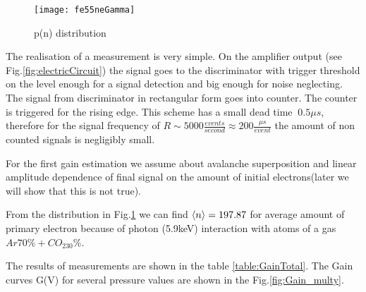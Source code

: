 	\begin{figure}[!h]
	\centering
	\texttt{[image: fe55neGamma]}
	\caption{ p(n) distribution}
	\label{fig:fe55_n_probability}
	\end{figure}
	
	The realisation of a measurement is very simple.  On the amplifier output (see Fig.\ref{fig:electricCircuit}) the signal goes to the discriminator with  trigger threshold on the level enough for a signal detection and big enough for noise neglecting. The signal from discriminator in rectangular form goes into counter. The counter is triggered for the rising edge. This scheme has a small dead time $~0.5 \mu s$, therefore for the signal frequency of $R \sim 5000 \frac{events}{second} \approx 200 \frac{\mu s}{event}$ the amount of non counted signals is negligibly small.
	
	For the first gain estimation we assume about avalanche superposition and linear amplitude dependence of final signal on the amount of initial electrons(later we will show that this is not true).
	
	From the distribution in Fig.\ref{fig:fe55_n_probability} we can find $\left< n \right> = 197.87$ for average amount of primary electron because of photon (5.9keV) interaction with atoms of a gas $Ar70\%+CO_230\%$.
	
	The results of measurements are shown in the table \ref{table:GainTotal}. The Gain curves G(V) for several pressure values are shown in the Fig.\ref{fig:Gain_multy}.
		
	
	
